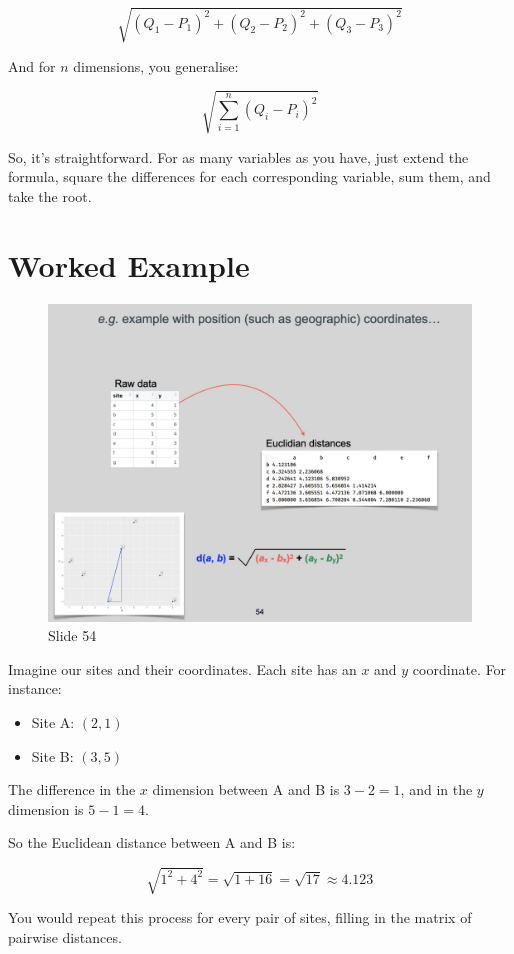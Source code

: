 \documentclass[
  12pt,
]{book}
\providecommand{\tightlist}{%
  \setlength{\itemsep}{0pt}\setlength{\parskip}{0pt}}
\begin{document}
\[
\sqrt{(Q_1 - P_1)^2 + (Q_2 - P_2)^2 + (Q_3 - P_3)^2}
\]

And for \(n\) dimensions, you generalise:

\[
\sqrt{\sum_{i=1}^{n} (Q_i - P_i)^2}
\]

So, it's straightforward. For as many variables as you have, just extend
the formula, square the differences for each corresponding variable, sum
them, and take the root.

\section{Worked Example}\label{worked-example}

\begin{figure}[ht]
\centering
\includegraphics[width=0.8\linewidth]{../images/BDC334/BDC334-054.jpeg}
\caption*{Slide 54}
\end{figure}

Imagine our sites and their coordinates. Each site has an \(x\) and
\(y\) coordinate. For instance:

\begin{itemize}
\tightlist
\item
  Site A: \((2, 1)\)
\item
  Site B: \((3, 5)\)
\end{itemize}

The difference in the \(x\) dimension between A and B is \(3 - 2 = 1\),
and in the \(y\) dimension is \(5 - 1 = 4\).

So the Euclidean distance between A and B is:

\[
\sqrt{1^2 + 4^2} = \sqrt{1 + 16} = \sqrt{17} \approx 4.123
\]

You would repeat this process for every pair of sites, filling in the
matrix of pairwise distances.
\end{document}
